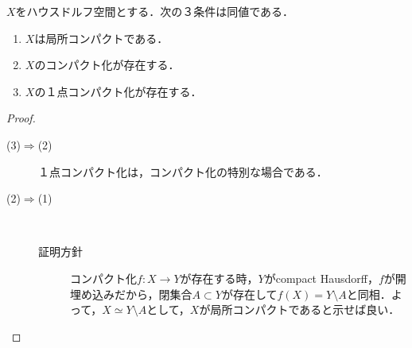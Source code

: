 \documentclass[uplatex,dvipdfmx]{jsreport}
\begin{document}
\begin{proposition}\label{prop-one-point-compactification}
    $X$をハウスドルフ空間とする．次の３条件は同値である．
    \begin{enumerate}
        \item $X$は局所コンパクトである．
        \item $X$のコンパクト化が存在する．
        \item $X$の１点コンパクト化が存在する．
    \end{enumerate}
\end{proposition}
\begin{proof}\mbox{}
    \begin{description}
        \item[(3)$\Rightarrow$(2)] １点コンパクト化は，コンパクト化の特別な場合である．
        \item[(2)$\Rightarrow$(1)] \mbox{}\\
        \begin{description}
            \item[証明方針] 
            コンパクト化$f:X\to Y$が存在する時，$Y$がcompact Hausdorff，$f$が開埋め込みだから，閉集合$A\subset Y$が存在して$f(X)=Y\setminus A$と同相．よって，$X\simeq Y\setminus A$として，$X$が局所コンパクトであると示せば良い．
            

\end{description}
\end{description}
\end{proof}
\end{document}

